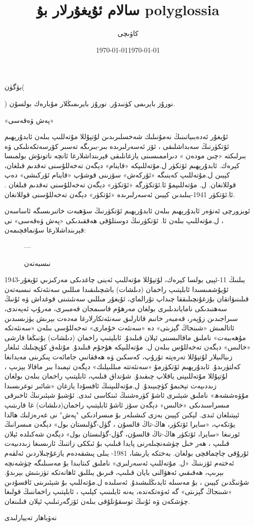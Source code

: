 \documentclass{article}
\title{سالام ئۇيغۇرلار بۇ polyglossia}
\author{كاۋىچى}
\date{\today}
\begin{document}
\maketitle

بۈگۈن(\date{\today}) نورۇز بايرىمى كۈنىدۇر. نورۇز بايرىمىڭلار مۇبارەك بولسۇن.


«پەش ۋەقەسى»

ئۇيغۇر ئەدەبىياتىنىڭ نەمۇنىلىك شەخسلىرىدىن لۇتپۇللا مۇتەللىپ بىلەن ئابدۇرېھىم ئۆتكۈرنىڭ سەبداشلىقى ، ئۆز ئەسەرلىرىدە بىر-بىرىگە تەسىر كۆرسەتكەنلىكى ۋە بىرلىكتە «چىن مودەن » دىراممىسىنى يازغانلىقى قېرىنداشلارغا ئانچە ناتونۇش بولمىسا كېرەك. ئابدۇرېھىم ئۆتكۈر ل.مۇتەللىپكە «قاينام» دېگەن تەخەللۇسنى تەقدىم قىلغان، كېيىن ل.مۇتەللىپ كەينىگە «ئۆركەش» سۆزىنى قوشۇپ «قاينام ئۆركىشى» دەپ قوللانغان. ل. مۇتەللىپمۇ ئا.ئۆتكۈرگە «ئۆتكۈر» دېگەن تەخەللۇسنى تەقدىم قىلغان . ئا.ئۆتكۈر 1941-يىلىدىن كېيىن ئەسەرلىرىدە «ئۆتكۈر» دېگەن تەخەللۇسنى قوللانغان.

ئوبزورچى ئەنۋەر ئابدۇرېھىم بىلەن ئابدۇرېھىم ئۆتكۈرنىڭ سۆھبەت خاتىرىسىگە ئاساسەن ، ل.مۇتەللىپ بىلەن ئا. ئۆتكۈرنىڭ دوستلۇقى ھەققىدىكى «پەش ۋەقەسى» نى قېرىنداشلارغا سۇنماقچىمەن:

\begin{figure}
	---
	\caption{نىسبەتەن}
\end{figure}

1943-يىلنىڭ 11-ئېيى بولسا كېرەك، لۇتپۇللا مۇتەللىپ ئەينى چاغدىكى مەركىزىي ئۇيغۇر ئۇيۇشمىسىدا ئابلېتىپ راخمان (دىلشات) باشچىلىقىدا مىللىي سەنئەتكە نىسبەتەن قىلىنىۋاتقان بۇزغۇنچىلىققا چىداپ تۇرالماي، ئۇيغۇر مىللىي سەنئىتىنى قوغداش ۋە ئۇنىڭ سەھنىدىكى ناماياندىلىرى بولغان مەرھۇم قاسىمجان قەمبىرى، مەرۇپ ئەپەندى، سىراجىدىن زۇپەر، قەمبەر خانىم قاتارلىق سەنئەتكارلارغا مەدەت بېرىش يۈزىسىدىن ئاتالمىش «شىنجاڭ گېزىتى» دە «سەنئەت خۇمارى» تەخەللۇسى بىلەن «سەنئەتكە مۇھەببەت» ناملىق ماقالىسىنى ئېلان قىلىدۇ. ئابلېتىپ راخمان (دىلشات) بۇنىڭغا قارشى «خالىس» دېگەن تەخەللۇس بىلەن ل. مۇتەللىپكە ھۇجۇم قىلىدۇ. مۇتلەق كۆپچىلىك ئىلغار زىيالىيلار لۇتپۇللا تەرەپتە تۇرۇپ، كەسكىن ۋە ھەققانىي جامائەت پىكرىنى مەيدانغا كەلتۈرىدۇ. ئابدۇرېھىم ئۆتكۈرمۇ «سەنئەتتە مىللىيلىك» دېگەن تېمىدا بىر ماقالا يېزىپ ، لۇتپۇللا مۇتەللىپنى ياقلاپ چىقىدۇ. شۇنداق قىلىپ، ئابلېتىپ راخمان بىلەن بولغان زىددىيەت تېخىمۇ كۈچىيىدۇ. ل.مۇتەللىپنىڭ ئاقسۇدا يازغان «شائىر توغرىسىدا مۇۋەششەھ» ناملىق شېئىرى ئاشۇ كۈرەشنىڭ ئىنكاسى ئىدى. ئۇشبۇ شېئىرنىڭ ئاخىرقى مىسراسىدىكى «خالىس» دېگەن سۆز ئاشۇ ئابلېتىپ راخمان(دىلشات) غا قارىتىپ ئېيتىلغان ئىدى. لېكىن كېيىن بەزى كىشىلەر بۇ مىسرادىكى "پەش" نى غەرەزلىك ھالدا يۆتكەپ، «سايرا ئۆتكۈر، ھاڭ-تاڭ قالسۇن ، گۈل-گۈلىستان بول» دېگەن مىسرانىڭ ئورنىغا «سايرا، ئۆتكۈر ھاڭ-تاڭ قالسۇن، گۈل-گۈلىستان بول» دېگەن شەكىلدە ئېلان قىلىپ ، ھەر خىل چۈشەنچىلەرنى پايدا قىلىپ بۇ ئىككى زاتنىڭ ئارىسىغا زىددىيەت ئۇرۇقى چاچماقچى بولغان. بەختكە يارىشا، 1981- يىلى پىشقەدەم يازغۇچىلاردىن ئەلقەم ئەختەم ئۆزىنىڭ «ل. مۇتەللىپ ئەسەرلىرى» ناملىق كىتابىدا بۇ مەسىلىگە چۈشەنچە بېرىپ، ھەقىقىي ئەھۋالنى بايان قىلىپ، قىرىق يىللىق ئاھانەتكە تۈزىتىش بېرىدۇ. شۇنىڭدىن كېيىن ، بۇ مەسىلە ئايدىڭلىشىدۇ. ئەسلىدە ل.مۇتەللىپ بۇ شېئىرىنى ئاقسۇدىن «شىنجاڭ گېزىتى» گە ئەۋەتكەندە، يەنە ئايلىنىپ كېلىپ ، ئابلېتىپ راخماننىڭ قولىغا چۈشكەن ۋە ئۇنىڭ توسقۇنلۇقى بىلەن ئۆزگەرتىلىپ ئېلان قىلىنغان.

نەۋباھار تەييارلىدى
\end{document}
